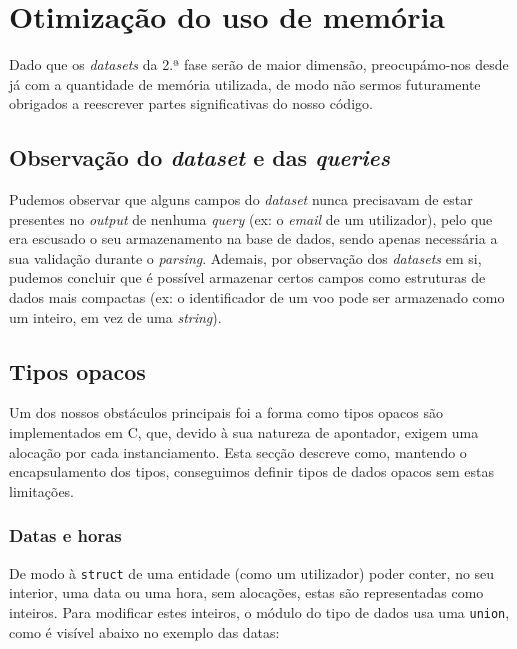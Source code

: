 \documentclass[12pt, a4paper]{article}
\begin{document}
\section{Otimização do uso de memória}

Dado que os \emph{datasets} da 2.ª fase serão de maior dimensão, preocupámo-nos desde já com a
quantidade de memória utilizada, de modo não sermos futuramente obrigados a reescrever partes
significativas do nosso código.

\subsection{Observação do \emph{dataset} e das \emph{queries}}

Pudemos observar que alguns campos do \emph{dataset} nunca precisavam de estar presentes no
\emph{output} de nenhuma \emph{query} (ex: o \emph{email} de um utilizador), pelo que era escusado
o seu armazenamento na base de dados, sendo apenas necessária a sua validação durante o
\emph{parsing}. Ademais, por observação dos \emph{datasets} em si, pudemos concluir que é possível
armazenar certos campos como estruturas de dados mais compactas (ex: o identificador de um voo
pode ser armazenado como um inteiro, em vez de uma \emph{string}).

\subsection{Tipos opacos}

Um dos nossos obstáculos principais foi a forma como tipos opacos são implementados em C, que,
devido à sua natureza de apontador, exigem uma alocação por cada instanciamento. Esta secção
descreve como, mantendo o encapsulamento dos tipos, conseguimos definir tipos de dados opacos sem
estas limitações.

\subsubsection{Datas e horas}

De modo à \texttt{struct} de uma entidade (como um utilizador) poder conter, no seu interior, uma
data ou uma hora, sem alocações, estas são representadas como inteiros. Para modificar estes
inteiros, o módulo do tipo de dados usa uma \texttt{union}, como é visível abaixo no exemplo das
datas:
\end{document}
